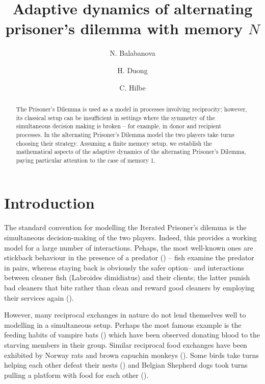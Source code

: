 \documentclass{article}
\title{Adaptive dynamics of alternating prisoner's dilemma with memory $N$}
\author[1,*]{N. Balabanova}
\author[1]{H. Duong}
\author[2]{C. Hilbe}
\affil[1]{School of Mathematics, University of Birmingham, Birmingham,~UK}
\affil[2]{Interdisciplinary Transformation University (IT:U), Linz, Austria}
\affil[*]{Corresponding author, n.balabanova@bham.ac.uk}
\date{\empty}
\theoremstyle{definition}
\numberwithin{equation}{section}
\begin{document}
\begin{titlepage}
\small
\maketitle




\begin{abstract}
\noindent
The Prisoner's Dilemma is used as a model in processes involving reciprocity; however, its classical setup can be insufficient in settings where the symmetry of the simultaneous decision making is broken -- for example, in donor and recipient processes. In the alternating Prisoner's Dilemma model the two players take turns choosing their strategy. Assuming a finite memory setup, we establish the mathematical aspects of the adaptive dynamics of the alternating Prisoner's Dilemma, paying particular attention to the case of memory 1. 
\end{abstract}
\end{titlepage}


\normalsize
\tableofcontents

\section{Introduction}
The standard convention for modelling the Iterated Prisoner's dilemma is the simultaneous decision-making of the two players. Indeed, this provides a working model for a large number of interactions. Pehaps, the most well-known ones are stickback behaviour in the presence of a predator (\cite{milinski1987tit}) -- fish examine the predator in pairs, whereas staying back is obviously the safer option-- and  interactions between cleaner fish (Labroides dimidiatus) and their clients; the latter punish bad cleaners that bite rather than clean and reward good cleaners by employing their services again (\cite{bshary2023marine}). 

However, many reciprocal exchanges in nature do not lend themselves well  to modelling in a simultaneous setup. Perhaps the most famous example is the feeding habits of vampire bats (\cite{wilkinson1984reciprocal}) which have been observed donating blood to the starving members in their group. Similar reciprocal food exchanges have been exhibited by Norway rats and brown capuchin monkeys (\cite{schweinfurth2019reciprocity}).  Some birds take turns helping each other defeat their nests (\cite{earl2025cryptic}) and Belgian Shepherd dogs took turns pulling a platform with food for each other (\cite{gfrerer2017working}).  
\end{document}
